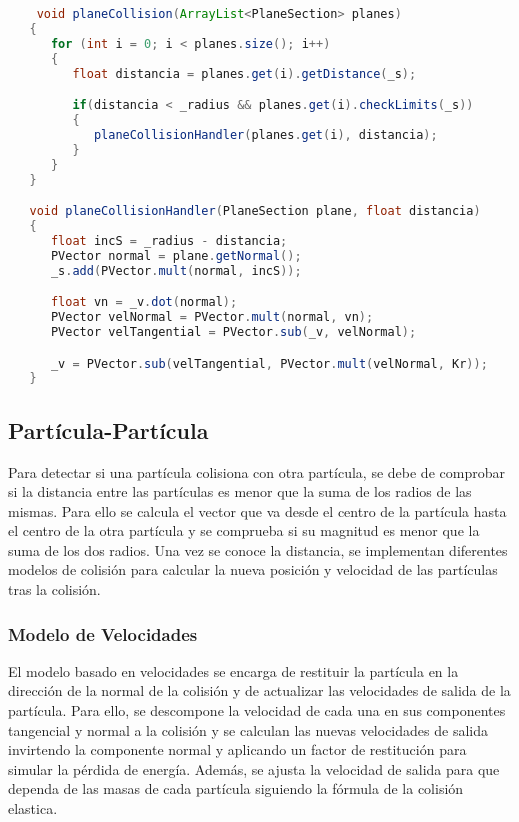 \documentclass{article}
\begin{document}
\begin{lstlisting}[language=Java, frame=single]


    void planeCollision(ArrayList<PlaneSection> planes)
   {
      for (int i = 0; i < planes.size(); i++)
      {
         float distancia = planes.get(i).getDistance(_s);

         if(distancia < _radius && planes.get(i).checkLimits(_s))
         {
            planeCollisionHandler(planes.get(i), distancia);
         }
      }
   }

   void planeCollisionHandler(PlaneSection plane, float distancia)
   {
      float incS = _radius - distancia;
      PVector normal = plane.getNormal();
      _s.add(PVector.mult(normal, incS));

      float vn = _v.dot(normal);
      PVector velNormal = PVector.mult(normal, vn);
      PVector velTangential = PVector.sub(_v, velNormal);

      _v = PVector.sub(velTangential, PVector.mult(velNormal, Kr));
   }

\end{lstlisting}

\subsection{Partícula-Partícula}\label{sec:particula-particula}

Para detectar si una partícula colisiona con otra partícula, se debe de comprobar si la distancia entre las partículas es menor que la suma de los radios de las mismas. Para ello se calcula el vector que va desde el centro de la partícula hasta el centro de la otra partícula y se comprueba si su magnitud es menor que la suma de los dos radios. Una vez se conoce la distancia, se implementan diferentes modelos de colisión para calcular la nueva posición y velocidad de las partículas tras la colisión.

\subsubsection{Modelo de Velocidades}\label{sec:modelo-velocidades}

El modelo basado en velocidades se encarga de restituir la partícula en la dirección de la normal de la colisión y de actualizar las velocidades de salida de la partícula. Para ello, se descompone la velocidad de cada una en sus componentes tangencial y normal a la colisión y se calculan las nuevas velocidades de salida invirtendo la componente normal y aplicando un factor de restitución para simular la pérdida de energía. Además, se ajusta la velocidad de salida para que dependa de las masas de cada partícula siguiendo la fórmula de la colisión elastica.
\end{document}
